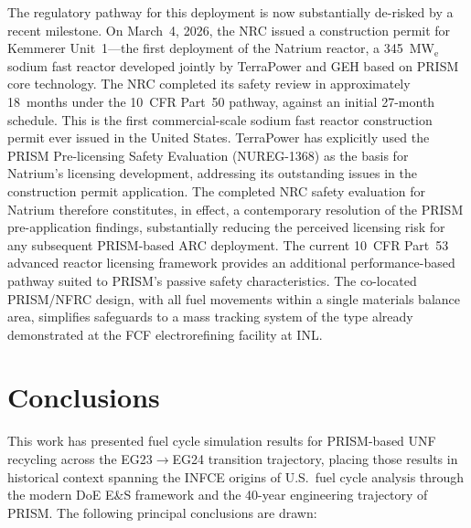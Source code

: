 \documentclass[10pt,twoside]{article}
\begin{document}
The regulatory pathway for this deployment is now substantially
de-risked by a recent milestone.  On March~4, 2026, the NRC issued a
construction permit for Kemmerer Unit~1---the first deployment of the
Natrium reactor, a 345~MW$_\text{e}$ sodium fast reactor developed
jointly by TerraPower and GEH based on PRISM core
technology.\cite{NatriumPermit2026}  The NRC completed its safety
review in approximately 18~months under the 10~CFR Part~50 pathway,
against an initial 27-month schedule.  This is the first commercial-scale
sodium fast reactor construction permit ever issued in the United States.
TerraPower has explicitly used the PRISM Pre-licensing Safety Evaluation
(NUREG-1368) as the basis for Natrium's licensing development, addressing
its outstanding issues in the construction permit
application.\cite{NRC1994,Hejzlar2021}  The completed NRC safety
evaluation for Natrium therefore constitutes, in effect, a contemporary
resolution of the PRISM pre-application findings, substantially reducing
the perceived licensing risk for any subsequent PRISM-based ARC
deployment.  The current 10~CFR Part~53 advanced reactor licensing
framework provides an additional performance-based pathway suited to
PRISM's passive safety characteristics.  The co-located PRISM/NFRC
design, with all fuel movements within a single materials balance area,
simplifies safeguards to a mass tracking system of the type already
demonstrated at the FCF electrorefining facility at INL.\cite{Till2011}

\section{Conclusions}

This work has presented fuel cycle simulation results for PRISM-based
UNF recycling across the EG23$\rightarrow$EG24 transition trajectory,
placing those results in historical context spanning the INFCE origins
of U.S.\ fuel cycle analysis through the modern DoE E\&S framework and
the 40-year engineering trajectory of PRISM.
The following principal conclusions are drawn:
\end{document}
